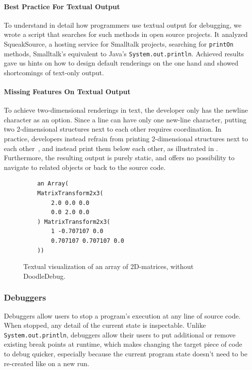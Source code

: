 \documentclass[english]{scrartcl}
\newcommand{\println}{\texttt{Sys\-tem.\-out.\-println}\xspace}
\begin{document}
\paragraph{Best Practice For Textual Output}
To understand in detail how programmers use textual output for debugging, we wrote a script that searches for such methods in open source projects.
It analyzed SqueakSource, a hosting service for Smalltalk projects, searching for \texttt{printOn} methods, Smalltalk's equivalent to Java's \println.
Achieved results\cite{Schw11b} gave us hints on how to design default renderings on the one hand and showed shortcomings of text-only output.

\paragraph{Missing Features On Textual Output}
To achieve two-dimensional renderings in text, the developer only has the newline character as an option.
Since a line can have only one new-line character, putting two 2-dimensional structures next to each other requires coordination. In practice, developers instead refrain from printing 2-dimensional structures next to each other~\cite{Schw11b}, and instead print them below each other, as illustrated in .
Furthermore, the resulting output is purely static, and offers no possibility to navigate to related objects or back to the source code.

\begin{figure}[h]
	\begin{lstlisting}
	an Array(
	MatrixTransform2x3(
		2.0 0.0 0.0
		0.0 2.0 0.0
	) MatrixTransform2x3(
		1 -0.707107 0.0
		0.707107 0.707107 0.0
	))
	\end{lstlisting}
	\caption{Textual visualization of an array of 2D-matrices, without DoodleDebug.}
\end{figure}

\subsubsection{Debuggers}
Debuggers allow users to stop a program's execution at any line of source code.
When stopped, any detail of the current state is inspectable.
Unlike \println, debuggers allow their users to put additional or remove existing break points at runtime, which makes changing the target piece of code to debug quicker, especially because the current program state doesn't need to be re-created like on a new run.
\end{document}
